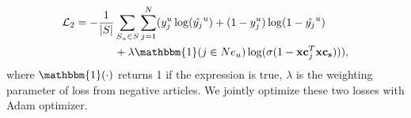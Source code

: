 \begin{equation}
    \label{eq:loss}
    \begin{split}
        \mathcal{L}_2 = - \frac{1}{|S|} & \sum_{S_u \in S}\sum_{j=1}^N ( y_j^u \log(\hat{y_j}^u) + (1-y_j^u)\log(1-\hat{y_j}^u) \\
        & +  \lambda \mathbbm{1}(j \in Ne_u) \log(\sigma(1-\mathbf{xc}_j^T\mathbf{xc_s}))),
    \end{split}
\end{equation}
where $\mathbbm{1}(\cdot)$ returns 1 if the expression is true, $\lambda$ is 
the weighting parameter of loss from negative articles. We jointly optimize these two losses 
with Adam optimizer.
